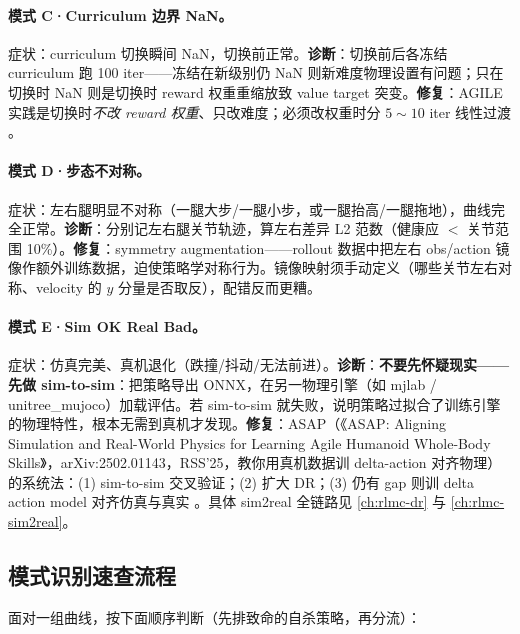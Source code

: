 \paragraph{模式 C·Curriculum 边界 NaN。}症状：curriculum 切换瞬间 NaN，切换前正常。\textbf{诊断}：切换前后各冻结 curriculum 跑 100 iter——冻结在新级别仍 NaN 则新难度物理设置有问题；只在切换时 NaN 则是切换时 reward 权重重缩放致 value target 突变。\textbf{修复}：AGILE 实践是切换时\emph{不改 reward 权重}、只改难度；必须改权重时分 $5\sim10$ iter 线性过渡 \cite{nvidia2026agile}。

\paragraph{模式 D·步态不对称。}症状：左右腿明显不对称（一腿大步/一腿小步，或一腿抬高/一腿拖地），曲线完全正常。\textbf{诊断}：分别记左右腿关节轨迹，算左右差异 L2 范数（健康应 $<$ 关节范围 10\%）。\textbf{修复}：symmetry augmentation——rollout 数据中把左右 obs/action 镜像作额外训练数据，迫使策略学对称行为。镜像映射须手动定义（哪些关节左右对称、velocity 的 $y$ 分量是否取反），配错反而更糟。

\paragraph{模式 E·Sim OK Real Bad。}症状：仿真完美、真机退化（跌撞/抖动/无法前进）。\textbf{诊断}：\textbf{不要先怀疑现实——先做 sim-to-sim}：把策略导出 ONNX，在另一物理引擎（如 mjlab / unitree\_mujoco）加载评估。若 sim-to-sim 就失败，说明策略过拟合了训练引擎的物理特性，根本无需到真机才发现。\textbf{修复}：ASAP（《ASAP: Aligning Simulation and Real-World Physics for Learning Agile Humanoid Whole-Body Skills》，arXiv:2502.01143，RSS'25，教你用真机数据训 delta-action 对齐物理）的系统法：(1) sim-to-sim 交叉验证；(2) 扩大 DR；(3) 仍有 gap 则训 delta action model 对齐仿真与真实 \cite{he2025asap}。具体 sim2real 全链路见 \cref{ch:rlmc-dr} 与 \cref{ch:rlmc-sim2real}。

\subsection{模式识别速查流程}

面对一组曲线，按下面顺序判断（先排致命的自杀策略，再分流）：

